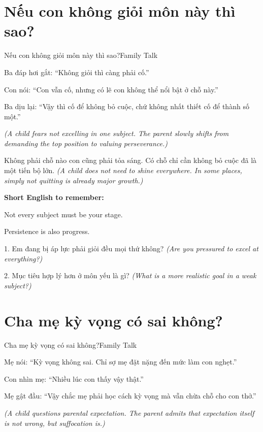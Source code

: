 \section{Nếu con không giỏi môn này thì sao?}
\begin{truyen}{Nếu con không giỏi môn này thì sao?}{Family Talk}

Ba đáp hơi gắt: ``Không giỏi thì càng phải cố.''

Con nói: ``Con vẫn cố, nhưng có lẽ con không thể nổi bật ở chỗ này.''

Ba dịu lại: ``Vậy thì cố để không bỏ cuộc, chứ không nhất thiết cố để thành số một.''

\textit{(A child fears not excelling in one subject. The parent slowly shifts from demanding the top position to valuing perseverance.)}
\end{truyen}

\begin{baihoc}
Không phải chỗ nào con cũng phải tỏa sáng. Có chỗ chỉ cần không bỏ cuộc đã là một tiến bộ lớn.
\textit{(A child does not need to shine everywhere. In some places, simply not quitting is already major growth.)}
\end{baihoc}

\begin{ghinhoanh}
\textbf{Short English to remember:}

Not every subject must be your stage.

Persistence is also progress.
\end{ghinhoanh}

\begin{tuhocnhanh}
1. Em đang bị áp lực phải giỏi đều mọi thứ không? \textit{(Are you pressured to excel at everything?)}

2. Mục tiêu hợp lý hơn ở môn yếu là gì? \textit{(What is a more realistic goal in a weak subject?)}
\end{tuhocnhanh}
\ngancach

\section{Cha mẹ kỳ vọng có sai không?}
\begin{truyen}{Cha mẹ kỳ vọng có sai không?}{Family Talk}

Mẹ nói: ``Kỳ vọng không sai. Chỉ sợ mẹ đặt nặng đến mức làm con nghẹt.''

Con nhìn mẹ: ``Nhiều lúc con thấy vậy thật.''

Mẹ gật đầu: ``Vậy chắc mẹ phải học cách kỳ vọng mà vẫn chừa chỗ cho con thở.''

\textit{(A child questions parental expectation. The parent admits that expectation itself is not wrong, but suffocation is.)}
\end{truyen}

